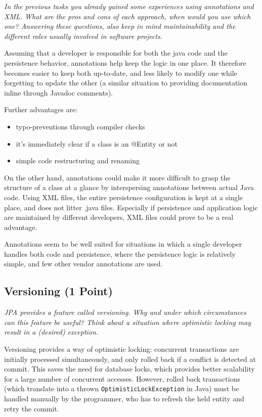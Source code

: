 \documentclass[a4paper,10pt]{article}
\begin{document}
\emph{In the previous tasks you already gained some experiences using annotations and XML. What are the
pros and cons of each approach, when would you use which one? Answering these questions, also keep
in mind maintainability and the different roles usually involved in software projects.}

\vspace{3mm}

Assuming that a developer is responsible for both the java code and the persistence behavior,
annotations help keep the logic in one place. It therefore becomes easier to keep both
up-to-date, and less likely to modify one while forgetting to update the other (a similar
situation to providing documentation inline through Javadoc comments).

Further advantages are:

\begin{itemize}
\item typo-preventions through compiler checks
\item it's immediately clear if a class is an @Entity or not
\item simple code restructuring and renaming
\end{itemize}

On the other hand, annotations could make it more difficult to grasp the structure of a class
at a glance by interspersing annotations between actual Java code. Using XML files,
the entire persistence configuration is kept at a single place, and does not litter
.java files. Especially if persistence and application logic are maintained by different
developers, XML files could prove to be a real advantage.

Annotations seem to be well suited for situations in which a single developer handles
both code and persistence, where the persistence logic is relatively simple,
and few other vendor annotations are used.

\subsection{Versioning (1 Point)}

\emph{JPA provides a feature called versioning. Why and under which circumstances can this feature be useful?
Think about a situation where optimistic locking may result in a (desired) exception.}

\vspace{3mm}

Versioning provides a way of optimistic locking: concurrent transactions are initially processed
simultaneously, and only rolled back if a conflict is detected at commit. This saves the need for 
database locks, which provides better scalability for a large number of concurrent accesses.
However, rolled back transactions (which translate into a thrown \lstinline|OptimisticLockException|
in Java) must be handled manually by the programmer, who has to refresh the held entity and
retry the commit.
\end{document}
